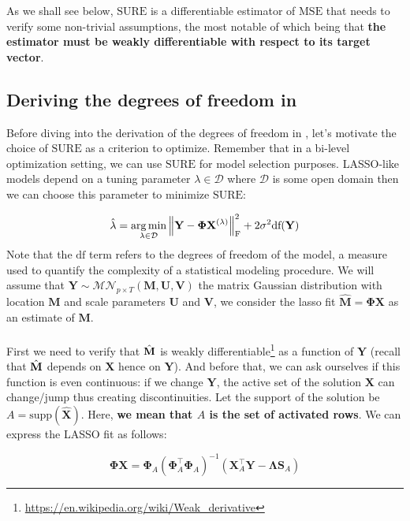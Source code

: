 \documentclass[a4paper,10pt]{article}
\theoremstyle{definition}
\begin{document}
As we shall see below, $\text{SURE}$ is a differentiable estimator of $\text{MSE}$ that needs to verify some
non-trivial assumptions, the most notable of which being that \textbf{the estimator must be weakly differentiable with
respect to its target vector}.

\subsection*{Deriving the degrees of freedom in }

Before diving into the derivation of the degrees of freedom in , let's motivate the choice of $\text{SURE}$ as a criterion
to optimize. Remember that in a bi-level optimization setting, we can use $\text{SURE}$ for model selection purposes. LASSO-like
models depend on a tuning parameter $\lambda \in \mathcal{D}$ where $\mathcal{D}$ is some open domain then we can choose this parameter to
minimize $\text{SURE}$:

\begin{equation*}
    \hat{\lambda} = \operatorname*{arg\,min}_{\lambda \in \mathcal{D}} \left \lVert  \mathbf{Y} - \mathbf{\Phi}\mathbf{X}^{(\lambda)} \right \rVert_{\text{F}}^2 + 2 \sigma^2 \text{df}(\bf{Y})
\end{equation*}
%
Note that the $\text{df}$ term refers to the degrees of freedom of the model, a measure used to quantify the complexity of a statistical modeling procedure.
We will assume that $\mathbf{Y} \sim \mathcal{MN}_{p\times T}(\mathbf{M}, \mathbf{U}, \mathbf{V})$ the matrix Gaussian distribution with location $\mathbf{M}$
and scale parameters $\mathbf{U}$ and $\mathbf{V}$, we consider the lasso fit $\mathbf{\hat{M} = \Phi X}$ as an estimate of $\mathbf{M}$.
\\
\\
First we need to verify that $\hat{\bf{M}}$ is weakly differentiable\footnote{\url{https://en.wikipedia.org/wiki/Weak_derivative}} as a function of $\mathbf{Y}$
(recall that $\hat{\bf{M}}$ depends on $\mathbf{X}$ hence on $\mathbf{Y}$). And before that, we can ask ourselves if this function is even continuous: if
we change $\mathbf{Y}$, the active set of the solution $\mathbf{X}$ can change/jump thus creating discontinuities. Let the support of the solution be $A = \text{supp}(\hat{\mathbf{X}})$.
Here, \textbf{we mean that $A$ is the set of activated rows}.
\newpage
We can express the LASSO fit as follows:

\begin{equation*}
    \mathbf{\Phi X} = \mathbf{\Phi}_A(\mathbf{\Phi}_A^{\top}\mathbf{\Phi}_A)^{-1}(\mathbf{X}^{\top}_A\mathbf{Y} - \mathbf{\Lambda}\mathbf{S}_A)
\end{equation*}
\end{document}
